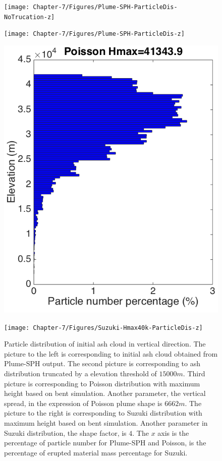 \begin{figure}[!htb]
    \centering
    \begin{minipage}{.247\textwidth}
        \centering
        \texttt{[image: Chapter-7/Figures/Plume-SPH-ParticleDis-NoTrucation-z]}
    \end{minipage}%
    \begin{minipage}{.247 \textwidth}
        \centering
        \texttt{[image: Chapter-7/Figures/Plume-SPH-ParticleDis-z]}
    \end{minipage}%
    \begin{minipage}{.247 \textwidth}
        \centering
        \includegraphics[width=0.99 \textwidth]{Chapter-7/Figures/Possion-Hmax40k-ParticleDis-z}
    \end{minipage}%
    \begin{minipage}{.247 \textwidth}
        \centering
        \texttt{[image: Chapter-7/Figures/Suzuki-Hmax40k-ParticleDis-z]}
    \end{minipage}%
    \caption{Particle distribution of initial ash cloud in vertical direction. The picture to the left is corresponding to initial ash cloud obtained from Plume-SPH output. The second picture is corresponding to ash distribution truncated by a elevation threshold of $15000 m$. Third picture is corresponding to Poisson distribution with maximum height based on bent simulation. Another parameter, the vertical spread, in the expression of Poisson plume shape is $6662 m$. The picture to the right is corresponding to Suzuki distribution with maximum height based on bent simulation. Another parameter in Suzuki distribution, the shape factor, is $4$. The $x$ axis is the percentage of particle number for Plume-SPH and Poisson, is the percentage of erupted material mass percentage for Suzuki.}

\end{figure}
